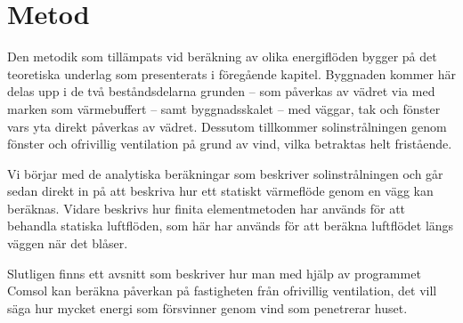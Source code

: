 \chapter{Metod}

Den metodik som tillämpats vid beräkning av olika energiflöden bygger på det teoretiska underlag som presenterats i föregående kapitel. Byggnaden kommer här delas upp i de två beståndsdelarna grunden – som påverkas av vädret via med marken som värmebuffert – samt byggnadsskalet – med väggar, tak och fönster vars yta direkt påverkas av vädret. Dessutom tillkommer solinstrålningen genom fönster och ofrivillig ventilation på grund av vind, vilka betraktas helt fristående.

Vi börjar med de analytiska beräkningar som beskriver solinstrålningen och går sedan direkt in på att beskriva hur ett statiskt värmeflöde genom en vägg kan beräknas. Vidare beskrivs hur finita elementmetoden har används för att behandla statiska luftflöden, som här har används för att beräkna luftflödet längs väggen när det blåser.

Slutligen finns ett avsnitt som beskriver hur man med hjälp av programmet Comsol kan beräkna påverkan på fastigheten från ofrivillig ventilation, det vill säga hur mycket energi som försvinner genom vind som penetrerar huset. 








